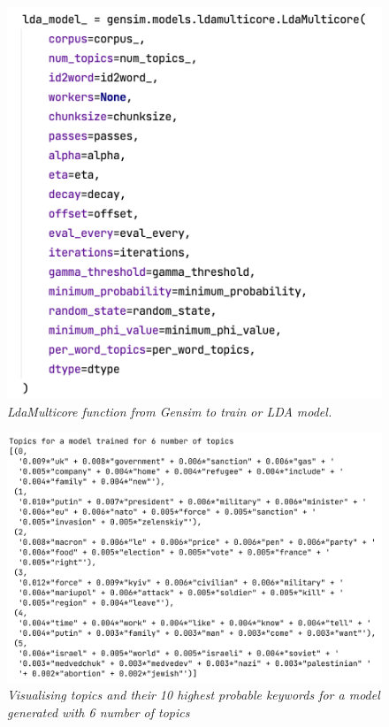 \documentclass[twoside,12pt,a4paper]{article}
\begin{document}
\begin{figure}[h]
\centering
\includegraphics[scale=0.45]{lda_multicore.png}
\caption{\textit{LdaMulticore function from Gensim to train or LDA model.}}
\label{fig:lda_multicore}
\end{figure}

\begin{figure}[h]
\centering
\includegraphics[scale=0.4]{visualise_topics.png}
\caption{\textit{Visualising topics and their 10 highest probable keywords for a model generated with 6 number of topics}}
\label{fig:visualise_topics}
\end{figure}
\end{document}

